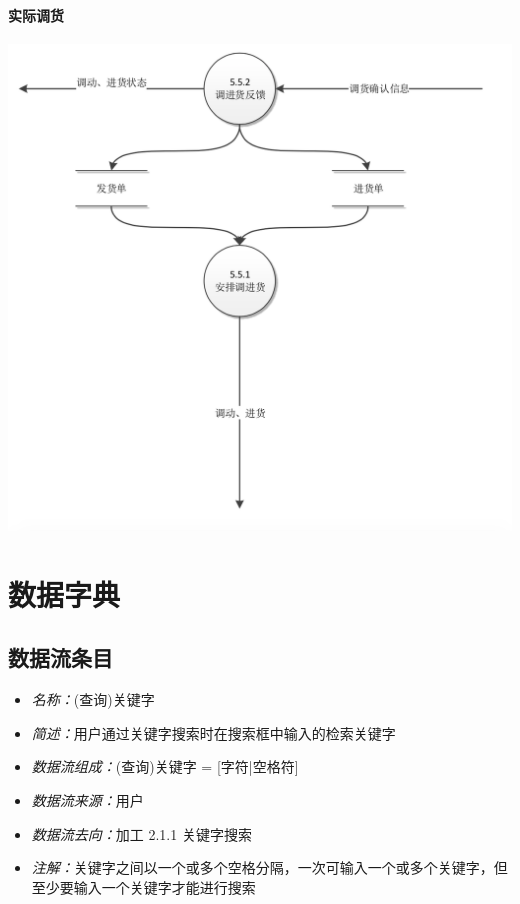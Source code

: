 \paragraph{实际调货}
\begin{center}
    \includegraphics[width=1\linewidth]{img/5.5.png}
\end{center}
\section{数据字典}
\subsection{数据流条目}

\begin{itemize}
	\item \textit{名称：}(查询)关键字
	\item \textit{简述：}用户通过关键字搜索时在搜索框中输入的检索关键字
	\item \textit{数据流组成：}(查询)关键字 = [字符|空格符]
	\item \textit{数据流来源：}用户
	\item \textit{数据流去向：}加工 2.1.1 关键字搜索
	\item \textit{注解：}关键字之间以一个或多个空格分隔，一次可输入一个或多个关键字，但至少要输入一个关键字才能进行搜索
\end{itemize}

